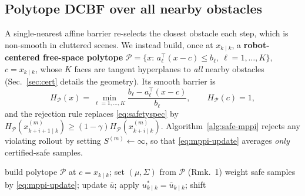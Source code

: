 \documentclass[letterpaper, 10 pt, conference]{ieeeconf}
\newcommand{\keyword}[1]{\textbf{#1}}
\begin{document}
\subsection{Polytope DCBF over all nearby obstacles}
A single-nearest affine barrier re-selects the closest obstacle each step, which is non-smooth in cluttered scenes. We instead build, once at $x_{k\mid k}$, a \keyword{robot-centered free-space polytope} $\mathcal P=\{x:\,a_\ell^\top(x-c)\le b_\ell,\ \ell=1,\dots,K\}$, $c=x_{k\mid k}$, whose $K$ faces are tangent hyperplanes to \emph{all} nearby obstacles (Sec.~\ref{sec:cert} details the geometry). Its smooth barrier is
\begin{equation}
H_{\mathcal P}(x)=\min_{\ell=1,\dots,K}\frac{b_\ell-a_\ell^\top(x-c)}{b_\ell},\qquad H_{\mathcal P}(c)=1,
\label{eq:HP}
\end{equation}
and the rejection rule replaces \eqref{eq:safetyspec} by $H_{\mathcal P}(x^{(m)}_{k+i+1\mid k})\ge(1-\gamma)H_{\mathcal P}(x^{(m)}_{k+i\mid k})$. Algorithm~\ref{alg:safe-mppi} rejects any violating rollout by setting $S^{(m)}\leftarrow\infty$, so that \eqref{eq:mppi-update} averages \emph{only} certified-safe samples.

\begin{algorithm}[H]
\caption{Safe MPPI (MPPI-DCBF) data engine}\label{alg:safe-mppi}
build polytope $\mathcal P$ at $c=x_{k\mid k}$; set $(\mu,\Sigma)$ from $\mathcal P$ (Rmk.~1)\;
weight safe samples by \eqref{eq:mppi-update}; update $\bar u$; apply $u^*_{k\mid k}=\bar u_{k\mid k}$; shift\;
\end{algorithm}
\end{document}

